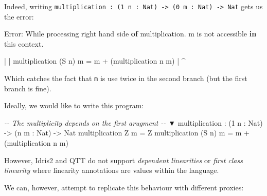 \documentclass[
]{article}
\newenvironment{Shaded}{}{}
\newcommand{\CommentTok}[1]{\textcolor[rgb]{0.38,0.63,0.69}{\textit{#1}}}
\newcommand{\DataTypeTok}[1]{\textcolor[rgb]{0.56,0.13,0.00}{#1}}
\newcommand{\DecValTok}[1]{\textcolor[rgb]{0.25,0.63,0.44}{#1}}
\newcommand{\FunctionTok}[1]{\textcolor[rgb]{0.02,0.16,0.49}{#1}}
\newcommand{\KeywordTok}[1]{\textcolor[rgb]{0.00,0.44,0.13}{\textbf{#1}}}
\newcommand{\NormalTok}[1]{#1}
\newcommand{\OperatorTok}[1]{\textcolor[rgb]{0.40,0.40,0.40}{#1}}
\newcommand{\OtherTok}[1]{\textcolor[rgb]{0.00,0.44,0.13}{#1}}
\begin{document}
Indeed, writing
\texttt{multiplication\ :\ (1\ n\ :\ Nat)\ -\textgreater{}\ (0\ m\ :\ Nat)\ -\textgreater{}\ Nat}
gets us the error:

\begin{Shaded}
\begin{Highlighting}[]
\DataTypeTok{Error}\OperatorTok{:} \DataTypeTok{While}\NormalTok{ processing right hand side }\KeywordTok{of}\NormalTok{ multiplication}\OperatorTok{.} 
\NormalTok{    m is }\FunctionTok{not}\NormalTok{ accessible }\KeywordTok{in}\NormalTok{ this context}\OperatorTok{.}

    \OperatorTok{|}
    \OperatorTok{|}\NormalTok{ multiplication (}\DataTypeTok{S}\NormalTok{ n) m }\OtherTok{=}\NormalTok{ m }\OperatorTok{+}\NormalTok{ (multiplication n m)}
    \OperatorTok{|}                          \OperatorTok{\^{}}
\end{Highlighting}
\end{Shaded}

Which catches the fact that \texttt{m} is use twice in the second branch
(but the first branch is fine).

Ideally, we would like to write this program:

\begin{Shaded}
\begin{Highlighting}[]
\CommentTok{{-}{-}        The multiplicity depends on the first arugment}
\CommentTok{{-}{-}                               ▼}
\NormalTok{multiplication }\OperatorTok{:}\NormalTok{ (}\DecValTok{1}\NormalTok{ n }\OperatorTok{:} \DataTypeTok{Nat}\NormalTok{) }\OtherTok{{-}\textgreater{}}\NormalTok{ (n m }\OperatorTok{:} \DataTypeTok{Nat}\NormalTok{) }\OtherTok{{-}\textgreater{}} \DataTypeTok{Nat}
\NormalTok{multiplication }\DataTypeTok{Z}\NormalTok{ m }\OtherTok{=} \DataTypeTok{Z}
\NormalTok{multiplication (}\DataTypeTok{S}\NormalTok{ n) m }\OtherTok{=}\NormalTok{ m }\OperatorTok{+}\NormalTok{ (multiplication n m)}
\end{Highlighting}
\end{Shaded}

However, Idris2 and QTT do not support \emph{dependent linearities} or
\emph{first class linearity} where linearity annotations are values
within the language.

We can, however, attempt to replicate this behaviour with different
proxies:
\end{document}
